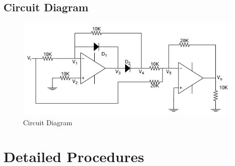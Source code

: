     \subsection{Circuit Diagram}
        \begin{figure}[h]
            \centering
            \includegraphics[width=0.7\linewidth]{Lab13/Lab13.drawio.png}
            \caption{Circuit Diagram}
            \label{l13f}
        \end{figure}
        \FloatBarrier

\section{Detailed Procedures}

